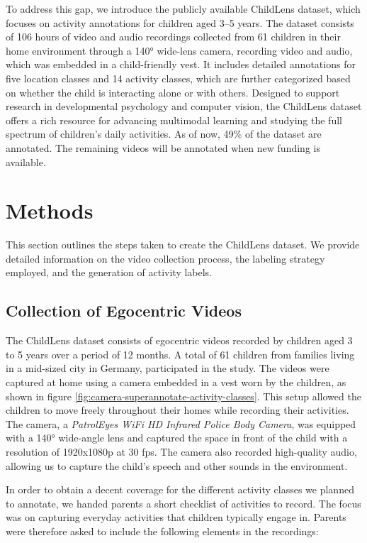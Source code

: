 \documentclass[
  man,floatsintext]{apa6}
\begin{document}
To address this gap, we introduce the publicly available ChildLens dataset, which focuses on activity annotations for children aged 3--5 years. The dataset consists of 106 hours of video and audio recordings collected from 61 children in their home environment through a 140° wide-lens camera, recording video and audio, which was embedded in a child-friendly vest. It includes detailed annotations for five location classes and 14 activity classes, which are further categorized based on whether the child is interacting alone or with others. Designed to support research in developmental psychology and computer vision, the ChildLens dataset offers a rich resource for advancing multimodal learning and studying the full spectrum of children's daily activities. As of now, 49\% of the dataset are annotated. The remaining videos will be annotated when new funding is available.

\section{Methods}\label{methods}

This section outlines the steps taken to create the ChildLens dataset. We provide detailed information on the video collection process, the labeling strategy employed, and the generation of activity labels.

\subsection{Collection of Egocentric Videos}\label{collection-of-egocentric-videos}

The ChildLens dataset consists of egocentric videos recorded by children aged 3 to 5 years over a period of 12 months. A total of 61 children from families living in a mid-sized city in Germany, participated in the study. The videos were captured at home using a camera embedded in a vest worn by the children, as shown in figure \ref{fig:camera-superannotate-activity-classes}. This setup allowed the children to move freely throughout their homes while recording their activities. The camera, a \emph{PatrolEyes WiFi HD Infrared Police Body Camera}, was equipped with a 140° wide-angle lens and captured the space in front of the child with a resolution of 1920x1080p at 30 fps. The camera also recorded high-quality audio, allowing us to capture the child's speech and other sounds in the environment.

In order to obtain a decent coverage for the different activity classes we planned to annotate, we handed parents a short checklist of activities to record. The focus was on capturing everyday activities that children typically engage in. Parents were therefore asked to include the following elements in the recordings:
\end{document}
